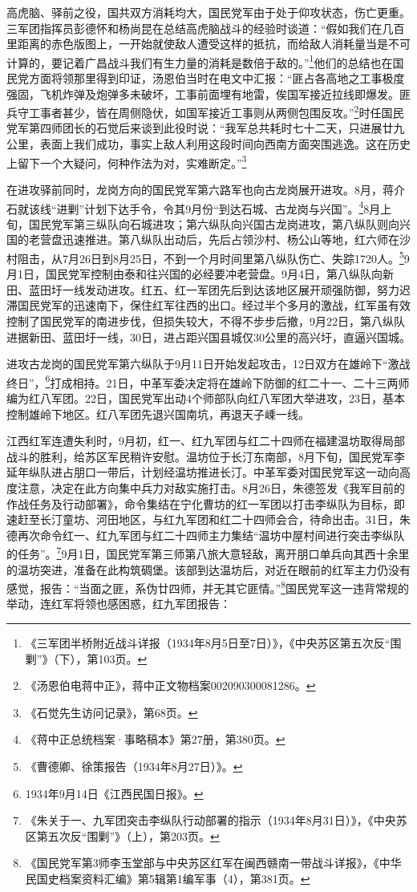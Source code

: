 高虎脑、驿前之役，国共双方消耗均大，国民党军由于处于仰攻状态，伤亡更重。三军团指挥员彭德怀和杨尚昆在总结高虎脑战斗的经验时谈道：“假如我们在几百里距离的赤色版图上，一开始就使敌人遭受这样的抵抗，而给敌人消耗量当是不可计算的，要记着广昌战斗我们有生力量的消耗是数倍于敌的。”\footnote{《三军团半桥附近战斗详报（1934年8月5日至7日）》，《中央苏区第五次反“围剿”》（下），第103页。}他们的总结也在国民党方面将领那里得到印证，汤恩伯当时在电文中汇报：“匪占各高地之工事极度强固，飞机炸弹及炮弹多未破坏，工事前面埋有地雷，俟国军接近拉线即爆发。匪兵守工事者甚少，皆在周侧隐伏，如国军接近工事则从两侧包围反攻。”\footnote{《汤恩伯电蒋中正》，蒋中正文物档案002090300081286。}时任国民党军第四师团长的石觉后来谈到此役时说：“我军总共耗时七十二天，只进展廿九公里，表面上我们成功，事实上敌人利用这段时间向西南方面突围逃逸。这在历史上留下一个大疑问，何种作法为对，实难断定。”\footnote{《石觉先生访问记录》，第68页。}


在进攻驿前同时，龙岗方向的国民党军第六路军也向古龙岗展开进攻。8月，蒋介石就该线“进剿”计划下达手令，令其9月份“到达石城、古龙岗与兴国”。\footnote{《蒋中正总统档案·事略稿本》第27册，第380页。}8月上旬，国民党军第三纵队向石城进攻；第六纵队向兴国古龙岗进攻，第八纵队则向兴国的老营盘迅速推进。第八纵队出动后，先后占领沙村、杨公山等地，红六师在沙村阻击，从7月26日到8月25日，不到一个月时间里第八纵队伤亡、失踪1720人。\footnote{《曹德卿、徐策报告（1934年8月27日）》。}9月1日，国民党军控制由泰和往兴国的必经要冲老营盘。9月4日，第八纵队向新田、蓝田圩一线发动进攻。红五、红一军团先后到达该地区展开顽强防御，努力迟滞国民党军的迅速南下，保住红军往西的出口。经过半个多月的激战，红军虽有效控制了国民党军的南进步伐，但损失较大，不得不步步后撤，9月22日，第八纵队进据新田、蓝田圩一线，30日，进占距兴国县城仅30公里的高兴圩，直逼兴国城。


进攻古龙岗的国民党军第六纵队于9月11日开始发起攻击，12日双方在雄岭下“激战终日”，\footnote{1934年9月14日《江西民国日报》。}打成相持。21日，中革军委决定将在雄岭下防御的红二十一、二十三两师编为红八军团。22日，国民党军出动4个师部队向红八军团大举进攻，23日，基本控制雄岭下地区。红八军团先退兴国南坑，再退天子嵊一线。


江西红军连遭失利时，9月初，红一、红九军团与红二十四师在福建温坊取得局部战斗的胜利，给苏区军民稍许安慰。温坊位于长汀东南部，8月下旬，国民党军李延年纵队进占朋口一带后，计划经温坊推进长汀。中革军委对国民党军这一动向高度注意，决定在此方向集中兵力对敌实施打击。8月26日，朱德签发《我军目前的作战任务及行动部署》，命令集结在宁化曹坊的红一军团以打击李纵队为目标，即速赶至长汀童坊、河田地区，与红九军团和红二十四师会合，待命出击。31日，朱德再次命令红一、红九军团与红二十四师主力集结“温坊中屋村间进行突击李纵队的任务”。\footnote{《朱关于一、九军团突击李纵队行动部署的指示（1934年8月31日）》，《中央苏区第五次反“围剿”》（上），第203页。}9月1日，国民党军第三师第八旅大意轻敌，离开朋口单兵向其西十余里的温坊突进，准备在此构筑碉堡。该部到达温坊后，对近在眼前的红军主力仍没有感觉，报告：“当面之匪，系伪廿四师，并无其它匪情。”\footnote{《国民党军第3师李玉堂部与中央苏区红军在闽西赣南一带战斗详报》，《中华民国史档案资料汇编》第5辑第1编军事（4），第381页。}国民党军这一违背常规的举动，连红军将领也感困惑，红九军团报告：

